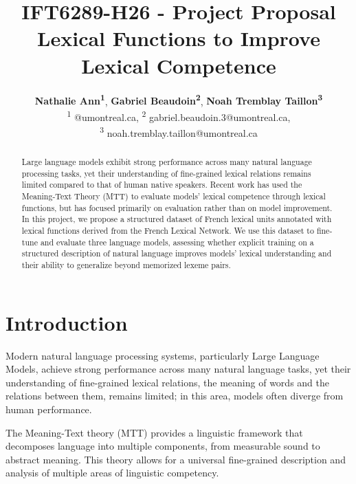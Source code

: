 \documentclass[11pt]{article}
\title{IFT6289-H26 - Project Proposal\\ Lexical Functions to Improve Lexical
  Competence}
\author{
    \textbf{Nathalie Ann\textsuperscript{1}},
    \textbf{Gabriel Beaudoin\textsuperscript{2}},
    \textbf{Noah Tremblay Taillon\textsuperscript{3}}
    \\
    \textsuperscript{1} @umontreal.ca,
    \textsuperscript{2} gabriel.beaudoin.3@umontreal.ca,\\
    \textsuperscript{3} noah.tremblay.taillon@umontreal.ca
    }
\begin{document}
\maketitle
\begin{abstract}
Large language models exhibit strong performance across many natural language
processing tasks, yet their understanding of fine-grained lexical relations
remains limited compared to that of human native speakers. Recent work has used 
the Meaning-Text Theory (MTT) to evaluate models' lexical competence through
lexical functions, but has focused primarily on evaluation rather than
on model improvement. In this project, we propose a structured dataset of French
lexical units annotated with lexical functions derived from the French Lexical
Network. We use this dataset to fine-tune and evaluate three language models,
assessing whether explicit training on a structured description of natural
language improves models' lexical understanding and their ability to generalize
beyond memorized lexeme pairs.
\end{abstract}

\section{Introduction}
Modern natural language processing systems, particularly Large Language Models,
achieve strong performance across many natural language tasks, yet their
understanding of fine-grained lexical relations, the meaning of words and the
relations between them, remains limited; in this area, models often diverge
from human performance.


The Meaning-Text theory (MTT)
\cite{melcukVersLinguistiqueSensTexte1997} provides a linguistic framework that
decomposes language into multiple components, from measurable sound to abstract
meaning.
This theory allows for a universal
fine-grained description and analysis of multiple areas of linguistic
competency.
\end{document}
